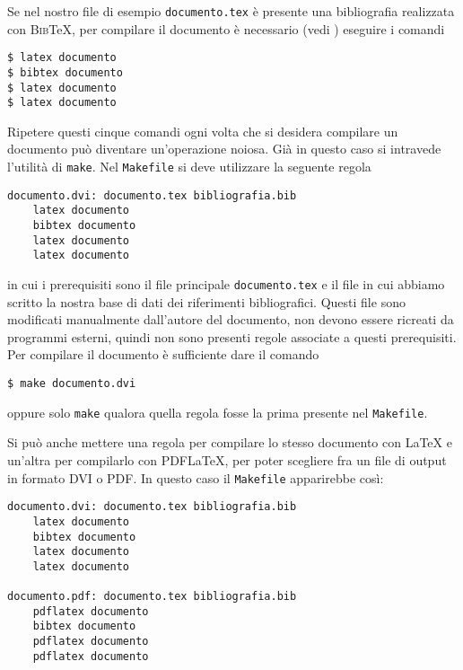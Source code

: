 Se nel nostro file di esempio \texttt{documento.tex} è presente una bibliografia
realizzata con \textsc{Bib}\TeX, per compilare il documento è necessario (vedi
\textcite[120]{pantieri:latex}) eseguire i comandi
\begin{verbatim}
$ latex documento
$ bibtex documento
$ latex documento
$ latex documento
\end{verbatim}
Ripetere questi cinque comandi ogni volta che si desidera compilare un documento
può diventare un'operazione noiosa.  Già in questo caso si intravede l'utilità
di \texttt{make}.  Nel \texttt{Makefile} si deve utilizzare la seguente regola
\begin{lstlisting}
documento.dvi: documento.tex bibliografia.bib
	latex documento
	bibtex documento
	latex documento
	latex documento
\end{lstlisting}
in cui i prerequisiti sono il file principale \texttt{documento.tex} e il file
in cui abbiamo scritto la nostra base di dati dei riferimenti bibliografici.
Questi file sono modificati manualmente dall'autore del documento, non devono
essere ricreati da programmi esterni, quindi non sono presenti regole associate
a questi prerequisiti.  Per compilare il documento è sufficiente dare il comando
\begin{verbatim}
$ make documento.dvi
\end{verbatim} %
oppure solo \texttt{make} qualora quella regola fosse la prima presente nel
\texttt{Makefile}.

Si può anche mettere una regola per compilare lo stesso documento con \LaTeX{}
e un'altra per compilarlo con \textsc{PDF}\LaTeX, per poter scegliere fra un
file di output in formato \textsc{DVI} o \textsc{PDF}.  In questo caso il
\texttt{Makefile} apparirebbe così:
\begin{lstlisting}[caption={La prima regola permette di compilare un documento con
\LaTeX, la seconda con \textsc{PDF}\LaTeX.},label=lst:dvi-pdf]
documento.dvi: documento.tex bibliografia.bib
	latex documento
	bibtex documento
	latex documento
	latex documento

documento.pdf: documento.tex bibliografia.bib
	pdflatex documento
	bibtex documento
	pdflatex documento
	pdflatex documento
\end{lstlisting}

